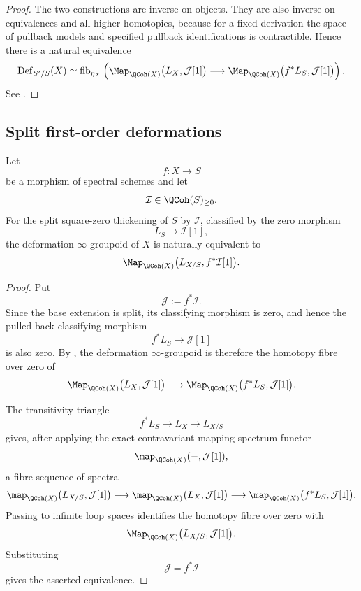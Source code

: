 \begin{proof}
The two constructions are inverse on objects. They are also inverse on
equivalences and all higher homotopies, because for a fixed derivation
the space of pullback models and specified pullback identifications is
contractible. Hence there is a natural equivalence
\[
    \operatorname{Def}_{S'/S}(X)
    \simeq
    \operatorname{fib}_{\eta_X}
    \left(
        \Map_{\QCoh(X)}
        \bigl(
            L_X,
            \mathcal J[1]
        \bigr)
        \longrightarrow
        \Map_{\QCoh(X)}
        \bigl(
            f^*L_S,
            \mathcal J[1]
        \bigr)
    \right).
\]
See
\cite[Sections~17.1.3 and~19.4.3]{LurieSAG}.
\end{proof}

\subsection{Split first-order deformations}

\begin{theorem}
\label{thm:global-split-first-order-deformations}
Let
\[
    f
    \colon
    X
    \longrightarrow
    S
\]
be a morphism of spectral schemes and let
\[
    \mathcal I
    \in
    \QCoh(S)_{\geq0}.
\]
For the split square-zero thickening of \(S\) by \(\mathcal I\),
classified by the zero morphism
\[
    L_S
    \longrightarrow
    \mathcal I[1],
\]
the deformation \(\infty\)-groupoid of \(X\) is naturally equivalent to
\[
    \Map_{\QCoh(X)}
    \bigl(
        L_{X/S},
        f^*\mathcal I[1]
    \bigr).
\]
\end{theorem}

\begin{proof}
Put
\[
    \mathcal J
    :=
    f^*\mathcal I.
\]
Since the base extension is split, its classifying morphism is zero, and
hence the pulled-back classifying morphism
\[
    f^*L_S
    \longrightarrow
    \mathcal J[1]
\]
is also zero. By
,
the deformation \(\infty\)-groupoid is therefore the homotopy fibre over
zero of
\[
    \Map_{\QCoh(X)}
    \bigl(
        L_X,
        \mathcal J[1]
    \bigr)
    \longrightarrow
    \Map_{\QCoh(X)}
    \bigl(
        f^*L_S,
        \mathcal J[1]
    \bigr).
\]

The transitivity triangle
\[
    f^*L_S
    \longrightarrow
    L_X
    \longrightarrow
    L_{X/S}
\]
gives, after applying the exact contravariant mapping-spectrum functor
\[
    \map_{\QCoh(X)}(-,\mathcal J[1]),
\]
a fibre sequence of spectra
\[
    \map_{\QCoh(X)}
    \bigl(
        L_{X/S},
        \mathcal J[1]
    \bigr)
    \longrightarrow
    \map_{\QCoh(X)}
    \bigl(
        L_X,
        \mathcal J[1]
    \bigr)
    \longrightarrow
    \map_{\QCoh(X)}
    \bigl(
        f^*L_S,
        \mathcal J[1]
    \bigr).
\]
Passing to infinite loop spaces identifies the homotopy fibre over zero
with
\[
    \Map_{\QCoh(X)}
    \bigl(
        L_{X/S},
        \mathcal J[1]
    \bigr).
\]
Substituting
\[
    \mathcal J
    =
    f^*\mathcal I
\]
gives the asserted equivalence.
\end{proof}

